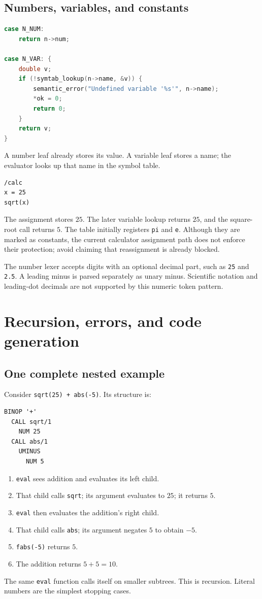 \documentclass[11pt,a4paper]{report}
\begin{document}
\section{Numbers, variables, and constants}
\begin{lstlisting}[language=C]
case N_NUM:
    return n->num;

case N_VAR: {
    double v;
    if (!symtab_lookup(n->name, &v)) {
        semantic_error("Undefined variable '%s'", n->name);
        *ok = 0;
        return 0;
    }
    return v;
}
\end{lstlisting}
A number leaf already stores its value. A variable leaf stores a name;
the evaluator looks up that name in the symbol table.
\begin{lstlisting}
/calc
x = 25
sqrt(x)
\end{lstlisting}
The assignment stores $25$. The later variable lookup returns $25$, and the
square-root call returns $5$. The table initially registers \texttt{pi} and
\texttt{e}. Although they are marked as constants, the current calculator
assignment path does not enforce their protection; avoid claiming that
reassignment is already blocked.

The number lexer accepts digits with an optional decimal part, such as
\texttt{25} and \texttt{2.5}. A leading minus is parsed separately as unary
minus. Scientific notation and leading-dot decimals are not supported by
this numeric token pattern.

\chapter{Recursion, errors, and code generation}
\section{One complete nested example}
Consider \texttt{sqrt(25) + abs(-5)}. Its structure is:
\begin{lstlisting}
BINOP '+'
  CALL sqrt/1
    NUM 25
  CALL abs/1
    UMINUS
      NUM 5
\end{lstlisting}
\begin{enumerate}
\item \texttt{eval} sees addition and evaluates its left child.
\item That child calls \texttt{sqrt}; its argument evaluates to $25$; it returns $5$.
\item \texttt{eval} then evaluates the addition's right child.
\item That child calls \texttt{abs}; its argument negates $5$ to obtain $-5$.
\item \texttt{fabs(-5)} returns $5$.
\item The addition returns $5+5=10$.
\end{enumerate}
The same \texttt{eval} function calls itself on smaller subtrees. This is
recursion. Literal numbers are the simplest stopping cases.
\end{document}
